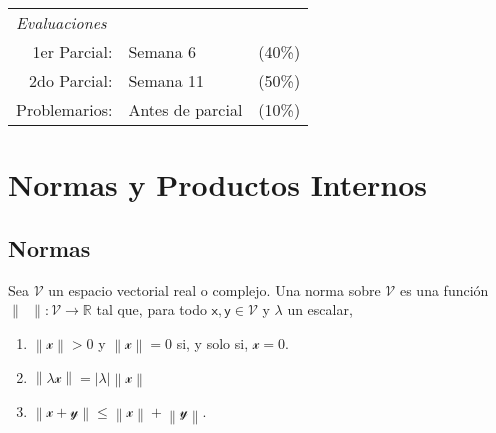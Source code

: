 \documentclass[twocolumn]{notasdeclase}
\newcommand{\ve}[1]{\mathscr{#1}}
\newcommand{\V}{\mathcal{V}}
\newcommand{\norm}{\lVert\phantom{a}\rVert}
\newcommand{\Norm}[1]{\left\lVert#1\right\rVert}
\newcommand{\R}{\mathbb{R}}
\begin{document}
\frontmatter

\begin{titlepage}
\end{titlepage}

\tableofcontents
\begin{flushleft}
	\begin{tabular}[c]{rlr} 
		\multicolumn{3}{l}{\Large\itshape Evaluaciones} \\[1em]
		{ 1}er Parcial: & Semana 6 &({40}\%) \\
		{ 2}do Parcial: & Semana 11 &({50}\%) \\
		 Problemarios: & Antes de parcial &({10}\%) \\
	\end{tabular}
\end{flushleft}
\mainmatter

\chapter{Normas y Productos Internos}

\section{Normas}
\noindent
\begin{defi}[norma]
	Sea $\mathcal{V}$ un espacio vectorial real o complejo. Una norma sobre $\V$ es una función $\norm\colon\V\to\R$ tal que, para todo $\mathsf{x, y}\in\V$ y $\lambda$ un escalar,
	\begin{enumerate}
		\item $\Norm{\ve x}>0$ y $\Norm{\ve x} = 0$ si, y solo si, $\ve x = 0$.
		\item $\Norm{\lambda\ve x} = |\lambda|\Norm{\ve x}$
		\item $\Norm{\ve x+\ve y} \leq \Norm{\ve{x}} + \Norm{\ve y}$.
	\end{enumerate}
\end{defi}
\end{document}
